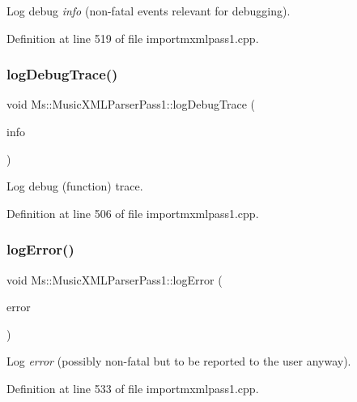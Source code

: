 Log debug {\itshape info} (non-\/fatal events relevant for debugging). 

Definition at line 519 of file importmxmlpass1.\+cpp.

\mbox{\label{class_ms_1_1_music_x_m_l_parser_pass1_adeeb5d31ceb27d6a85d6ff843ca11512}} 
\subsubsection{\texorpdfstring{log\+Debug\+Trace()}{logDebugTrace()}}
{\footnotesize\ttfamily void Ms\+::\+Music\+X\+M\+L\+Parser\+Pass1\+::log\+Debug\+Trace (\begin{DoxyParamCaption}\item[{const Q\+String \&}]{info }\end{DoxyParamCaption})}

Log debug (function) trace. 

Definition at line 506 of file importmxmlpass1.\+cpp.

\mbox{\label{class_ms_1_1_music_x_m_l_parser_pass1_a204f3b7acd0364a787806b53ae5ea663}} 
\subsubsection{\texorpdfstring{log\+Error()}{logError()}}
{\footnotesize\ttfamily void Ms\+::\+Music\+X\+M\+L\+Parser\+Pass1\+::log\+Error (\begin{DoxyParamCaption}\item[{const Q\+String \&}]{error }\end{DoxyParamCaption})}

Log {\itshape error} (possibly non-\/fatal but to be reported to the user anyway). 

Definition at line 533 of file importmxmlpass1.\+cpp.

\mbox{\label{class_ms_1_1_music_x_m_l_parser_pass1_a06fb8196bef4664168ea4f3f3815c4c4}} 
